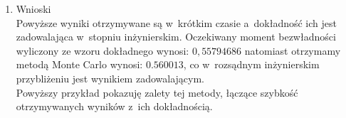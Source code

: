 \documentclass[10pt,a4paper]{article}
\begin{document}
\begin{enumerate}
\begin{figure}
\end{figure}
\item Wnioski\\
Powyższe wyniki otrzymywane są w~krótkim czasie a~dokładność ich jest zadowalająca w~stopniu inżynierskim. Oczekiwany moment bezwładności wyliczony ze wzoru dokładnego wynosi: $0,55794686$ natomiast otrzymamy metodą Monte Carlo wynosi: $0.560013$, co w~rozsądnym inżynierskim przybliżeniu jest wynikiem zadowalającym.\\
Powyższy przykład pokazuję zalety tej metody, łączące szybkość otrzymywanych wyników z~ich dokładnością.
\end{enumerate}
\end{document}
